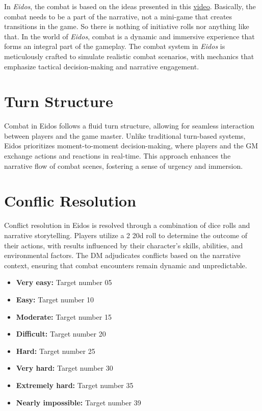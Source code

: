 \documentclass[12pt]{book}
\begin{document}
In \textit{Eidos}, the combat is based on the ideas presented in this \href{https://www.youtube.com/watch?v=0o5vWmoS3KU&ab_channel=SimplyWyvern}{video}. Basically, the combat needs to be a part of the narrative, not a mini-game that creates transitions in the game. So there is nothing of initiative rolls nor anything like that. In the world of \textit{Eidos}, combat is a dynamic and immersive experience that forms an integral part of the gameplay. The combat system in \textit{Eidos} is meticulously crafted to simulate realistic combat scenarios, with mechanics that emphasize tactical decision-making and narrative engagement.

\section{Turn Structure}

Combat in Eidos follows a fluid turn structure, allowing for seamless interaction between players and the game master. Unlike traditional turn-based systems, Eidos prioritizes moment-to-moment decision-making, where players and the GM exchange actions and reactions in real-time. This approach enhances the narrative flow of combat scenes, fostering a sense of urgency and immersion.

\section{Conflic Resolution}

Conflict resolution in Eidos is resolved through a combination of dice rolls and narrative storytelling. Players utilize a 2 20d roll to determine the outcome of their actions, with results influenced by their character's skills, abilities, and environmental factors. The DM adjudicates conflicts based on the narrative context, ensuring that combat encounters remain dynamic and unpredictable. 

\begin{itemize}
    \item \textbf{Very easy:} Target number 05
    \item \textbf{Easy:} Target number 10
    \item \textbf{Moderate:} Target number 15
    \item \textbf{Difficult:} Target number 20
    \item \textbf{Hard:} Target number 25
    \item \textbf{Very hard:} Target number 30
    \item \textbf{Extremely hard:} Target number 35
    \item \textbf{Nearly impossible:} Target number 39
\end{itemize}
\end{document}

